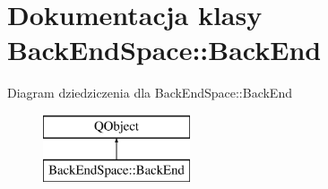 \hypertarget{class_back_end_space_1_1_back_end}{}\section{Dokumentacja klasy Back\+End\+Space\+:\+:Back\+End}
\label{class_back_end_space_1_1_back_end}
Diagram dziedziczenia dla Back\+End\+Space\+:\+:Back\+End\begin{figure}[H]
\begin{center}
\leavevmode
\includegraphics[height=2.000000cm]{class_back_end_space_1_1_back_end}
\end{center}
\end{figure}
